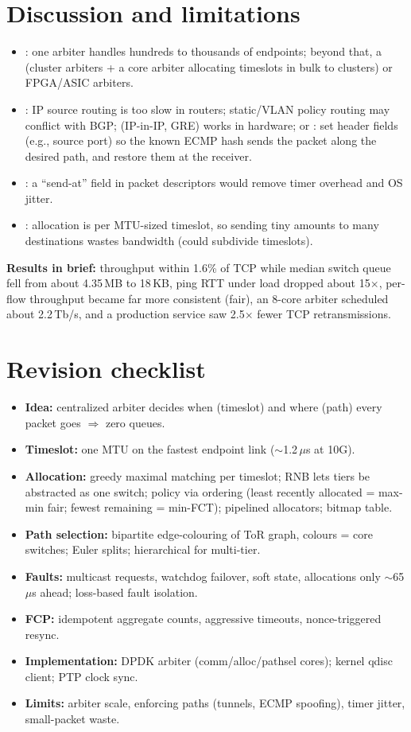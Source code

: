 \section{Discussion and limitations}
\begin{itemize}
\item {}: one arbiter handles hundreds to thousands of endpoints; beyond that, a  (cluster arbiters + a core arbiter allocating timeslots in bulk to clusters) or FPGA/ASIC arbiters.
\item {}: IP source routing is too slow in routers; static/VLAN policy routing may conflict with BGP;  (IP-in-IP, GRE) works in hardware; or : set header fields (e.g., source port) so the known ECMP hash sends the packet along the desired path, and restore them at the receiver.
\item {}: a ``send-at'' field in packet descriptors would remove timer overhead and OS jitter.
\item {}: allocation is per MTU-sized timeslot, so sending tiny amounts to many destinations wastes bandwidth (could subdivide timeslots).
\end{itemize}
\textbf{Results in brief:} throughput within 1.6\% of TCP while median switch queue fell from about 4.35\,MB to 18\,KB, ping RTT under load dropped about 15$\times$, per-flow throughput became far more consistent (fair), an 8-core arbiter scheduled about 2.2\,Tb/s, and a production service saw 2.5$\times$ fewer TCP retransmissions.

\section{Revision checklist}
\begin{itemize}
\item \textbf{Idea:} centralized arbiter decides when (timeslot) and where (path) every packet goes $\Rightarrow$ zero queues.
\item \textbf{Timeslot:} one MTU on the fastest endpoint link ($\sim$1.2\,$\mu$s at 10G).
\item \textbf{Allocation:} greedy maximal matching per timeslot; RNB lets tiers be abstracted as one switch; policy via ordering (least recently allocated = max-min fair; fewest remaining = min-FCT); pipelined allocators; bitmap table.
\item \textbf{Path selection:} bipartite edge-colouring of ToR graph, colours = core switches; Euler splits; hierarchical for multi-tier.
\item \textbf{Faults:} multicast requests, watchdog failover, soft state, allocations only $\sim$65\,$\mu$s ahead; loss-based fault isolation.
\item \textbf{FCP:} idempotent aggregate counts, aggressive timeouts, nonce-triggered resync.
\item \textbf{Implementation:} DPDK arbiter (comm/alloc/pathsel cores); kernel qdisc client; PTP clock sync.
\item \textbf{Limits:} arbiter scale, enforcing paths (tunnels, ECMP spoofing), timer jitter, small-packet waste.
\end{itemize}
